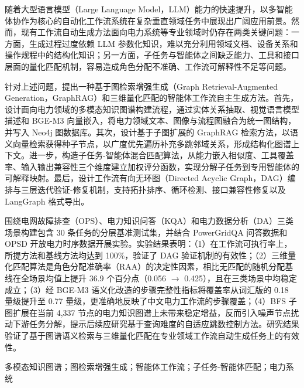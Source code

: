 \abstractch

随着大型语言模型（Large Language Model，LLM）能力的快速提升，以多智能体协作为核心的自动化工作流系统在复杂垂直领域任务中展现出广阔应用前景。然而，现有工作流自动生成方法面向电力系统等专业领域时仍存在两类关键问题：一方面，生成过程过度依赖 LLM 参数化知识，难以充分利用领域文档、设备关系和操作规程中的结构化知识；另一方面，子任务与智能体之间缺乏能力、工具和接口层面的量化匹配机制，容易造成角色分配不准确、工作流可解释性不足等问题。

针对上述问题，提出一种基于图检索增强生成（Graph Retrieval-Augmented Generation，GraphRAG）和三维量化匹配的智能体工作流自主生成方法。首先，设计面向电力领域的多模态知识图谱构建流程，通过实体关系抽取、视觉语言模型描述和 BGE-M3 向量嵌入，将电力领域文本、图像与流程图融合为统一图结构，并写入 Neo4j 图数据库。其次，设计基于子图扩展的 GraphRAG 检索方法，以语义向量检索获得种子节点，以广度优先遍历补充多跳邻域关系，形成结构化图谱上下文。进一步，构造子任务-智能体混合匹配算法，从能力嵌入相似度、工具覆盖率、输入输出兼容性三个维度建立加权评分函数，实现分解子任务到专用智能体的可解释映射。最后，设计工作流有向无环图（Directed Acyclic Graph，DAG）编排与三层迭代验证-修复机制，支持拓扑排序、循环检测、接口兼容性修复以及 LangGraph 格式导出。

围绕电网故障排查（OPS）、电力知识问答（KQA）和电力数据分析（DA）三类场景构建包含 30 条任务的分层基准测试集，并结合 PowerGridQA 问答数据和 OPSD 开放电力时序数据开展实验。实验结果表明：（1）在工作流可执行率上，所提方法和基线方法均达到 100\%，验证了 DAG 验证机制的有效性；（2）三维量化匹配算法是角色分配准确率（RAA）的决定性因素，相比无匹配的随机分配基线在全场景均值上提升 36.9 个百分点（0.056 $\rightarrow$ 0.425），且在三类场景中均稳定成立；（3）经 BGE-M3 语义化改造的步骤完整性指标将覆盖率从词汇版的 0.18 量级提升至 0.77 量级，更准确地反映了中文电力工作流的步骤覆盖；（4）BFS 子图扩展在当前 4{,}337 节点的电力知识图谱上未带来稳定增益，反而引入噪声节点扰动下游任务分解，提示后续应研究基于查询难度的自适应跳数控制方法。研究结果验证了基于图谱语义检索与三维量化匹配在专业领域工作流自动生成任务上的有效性。

\vspace{5pt}

\keywordsch 多模态知识图谱；图检索增强生成；智能体工作流；子任务-智能体匹配；电力系统

